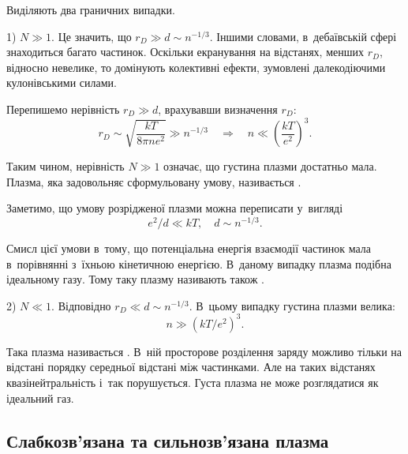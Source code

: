 Виділяють два граничних випадки.

1) $N \gg 1$. Це значить, що $r_D \gg d \sim n^{-1/3}$. Іншими словами, в~дебаївській сфері знаходиться багато частинок. Оскільки екранування на відстанях, менших $r_D$, відносно невелике, то домінують колективні ефекти, зумовлені далекодіючими кулонівськими силами.

Перепишемо нерівність $r_D \gg d$, врахувавши визначення $r_D$:
\begin{equation*}
	r_D \sim \sqrt{\frac{kT}{8\pi ne^2}} \gg n^{-1/3} \quad\Rightarrow\quad n \ll \left(\frac{kT}{e^2}\right)^3.
\end{equation*}

Таким чином, нерівність $N \gg 1$ означає, що густина плазми достатньо мала. Плазма, яка задовольняє сформульовану умову, називається .

Заметимо, що умову розрідженої плазми можна переписати у~вигляді
\begin{equation*}
	e^2/d \ll kT, \quad d \sim n^{-1/3}.
\end{equation*}

Смисл цієї умови в~тому, що потенціальна енергія взаємодії частинок мала в~порівнянні з~їхньою кінетичною енергією. В~даному випадку плазма подібна ідеальному газу. Тому таку плазму називають також .

2) $N \ll 1$. Відповідно $r_D \ll d \sim n^{-1/3}$. В~цьому випадку густина плазми велика:
\begin{equation*}
	n \gg (kT/e^2)^3.
\end{equation*}

Така плазма називається . В~ній просторове розділення заряду можливо тільки на відстані порядку середньої відстані між частинками. Але на таких відстанях квазінейтральність і~так порушується. Густа плазма не може розглядатися як ідеальний газ.

\subsection{Слабкозв'язана та сильнозв'язана плазма}

